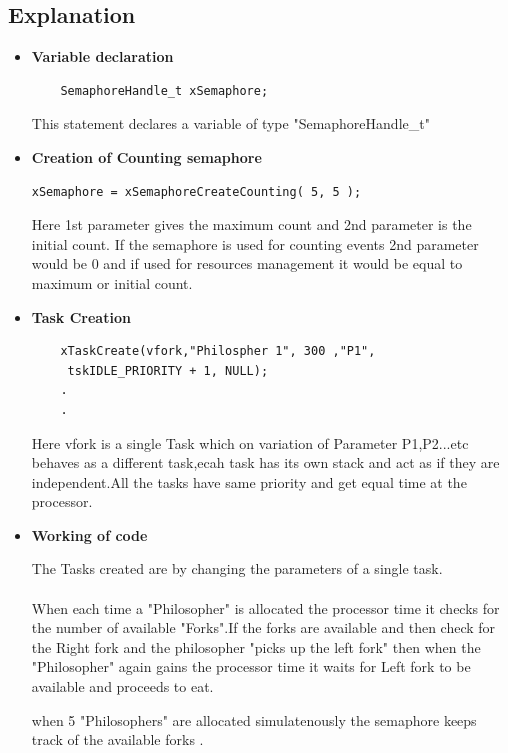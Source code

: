 \documentclass[11pt,a4paper]{article}
\begin{document}
\subsection{Explanation}
\begin{itemize}
	\item \textbf{Variable declaration}	
	
	\begin{lstlisting}
	SemaphoreHandle_t xSemaphore;
	\end{lstlisting}
	
	This statement declares a variable of type "SemaphoreHandle\_t"
	
	\item \textbf{Creation of Counting semaphore}
	
	\begin{lstlisting}
xSemaphore = xSemaphoreCreateCounting( 5, 5 );
	\end{lstlisting}
	
	Here 1st parameter gives the maximum count and 2nd parameter is the initial count.
	If the semaphore is used for counting events 2nd parameter would be 0 and if used for resources management it would be equal to maximum or initial count.
	\\
	\item \textbf{Task Creation }
	\begin{lstlisting}
	xTaskCreate(vfork,"Philospher 1", 300 ,"P1",
	 tskIDLE_PRIORITY + 1, NULL);
	.
	.
	\end{lstlisting}
	Here vfork is a single Task which on variation of Parameter P1,P2...etc behaves as a different task,ecah task has its own stack and act as if they are independent.All the tasks have same priority and get equal time at the processor.
	\\
	\item \textbf{Working of code}
	
	The Tasks created are by changing the parameters of a single task.
	\\
	\\
	When each time a "Philosopher" is allocated the processor time it checks for the number of available "Forks".If the forks are available and then check for the Right fork and the philosopher "picks up the left fork" then when the "Philosopher" again gains the processor time it waits for Left fork to be available and proceeds to eat.
	
	when 5 "Philosophers" are allocated simulatenously the semaphore keeps track of the available forks .
	

\end{itemize}
\end{document}
